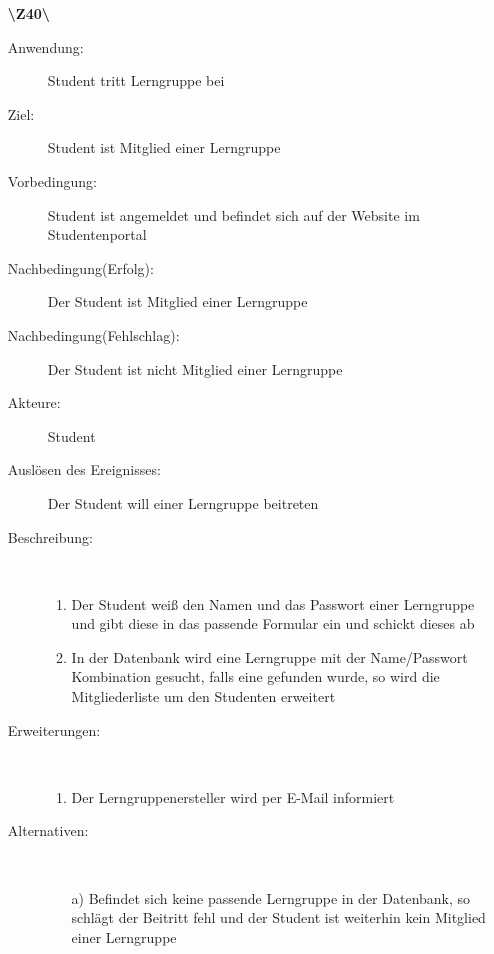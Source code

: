 \documentclass[a4paper]{article}
\begin{document}
\begin{enumerate}
  \item[\textbf{\textbackslash Z40\textbackslash}] \begin{description}
  \item[Anwendung:] Student tritt Lerngruppe bei
  \item[Ziel:] Student ist Mitglied einer Lerngruppe
  	\item[Vorbedingung:] Student ist angemeldet und befindet sich auf der Website im Studentenportal
  	\item[Nachbedingung(Erfolg):] Der Student ist Mitglied einer Lerngruppe
  	\item[Nachbedingung(Fehlschlag):] Der Student ist nicht Mitglied einer Lerngruppe
  	\item[Akteure:] Student
  	\item[Auslösen des Ereignisses:] Der Student will einer Lerngruppe beitreten
  	\item[Beschreibung:]~
  	\begin{enumerate}[1.]
  	  \item Der Student weiß den Namen und das Passwort einer Lerngruppe und gibt diese in das passende Formular ein und schickt dieses ab
  	  \item In der Datenbank wird eine Lerngruppe mit der Name/Passwort Kombination gesucht, falls eine gefunden wurde, so wird die Mitgliederliste um den Studenten erweitert
  	\end{enumerate}
  	\item[Erweiterungen:]~
  	\begin{enumerate}
  	  \item Der Lerngruppenersteller wird per E-Mail informiert
  	 \end{enumerate}
  	\item[Alternativen:] ~
  	\begin{enumerate}
  	  \item[a)] Befindet sich keine passende Lerngruppe in der Datenbank, so schlägt der Beitritt fehl und der Student ist weiterhin kein Mitglied einer Lerngruppe
  	 \end{enumerate}  
  \end{description}
  \pagebreak
  

\end{enumerate}
\end{document}
